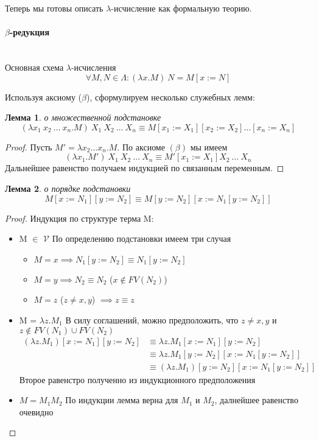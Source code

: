 \documentclass[lambda.tex]{subfiles}
\begin{document}

Теперь мы готовы описать $\lambda$-исчисление как формальную теорию.

\newpage
\paragraph{$\beta$-редукция} %
\label{par:beta reduction}~\\

Основная схема $\lambda$-исчисления
\begin{equation*}
	\forall M, N \in \Lambda : (\lambda x.M)\ N = M[x := N]\tag{$\beta$}
\end{equation*}

Используя аксиому ($\beta$), сформулируем несколько служебных лемм:
\newtheorem{lemma}{Лемма}
\begin{lemma}{о множественной подстановке}
	\[(\lambda x_1 \ x_2 \ \dots\ x_n .M)\ X_1 \ X_2 \ \dots\ X_n \equiv M[x_1 := X_1 ][x_2 := X_2]\dots[x_n := X_n ]\]
\end{lemma}
\begin{proof}
	Пусть $M' = \lambda x_2 \dots x_n .M$. По аксиоме $(\beta)$ мы имеем
	\[(\lambda x_1 .M')\ X_1 \ X_2 \ \dots\ X_n \equiv M'[x_1 := X_1 ] X_2 \ \dots\ X_n\]
	Дальнейшее равенство получаем индукцией по связанным переменным.
\end{proof}

\begin{lemma}{о порядке подстановки}
	\[M[x := N_1][y := N_2] \equiv M[y := N_2][x := N_1[y := N_2]]\]
\end{lemma}
\begin{proof}
	Индукция по структуре терма M: \\
	\begin{itemize}
		\item M $\in$ $\mathcal{V}$ По определению подстановки имеем три случая
		\begin{itemize}
		 	\item $M = x \implies N_1[y := N_2] \equiv N_1[y := N_2]$
		 	\item $M = y \implies N_2 \equiv N_2$ ($x\not\in FV(N_2)$)
		 	\item $M = z$ ($z \neq x, y$) $\implies z \equiv z$
		 \end{itemize}
		 \item M = $\lambda z.M_1$
		 В силу соглашений, можно предположить, что $z \neq x,y$ и $z\not\in FV(N_1) \cup FV(N_2)$
		 \begin{align*}
		 	(\lambda z.M_1)[x := N_1][y := N_2] &\equiv \lambda z.M_1[x := N_1][y := N_2]\\
		 										&\equiv \lambda z.M_1[y := N_2][x := N_1[y := N_2]] \\
		 										&\equiv (\lambda z.M_1)[y := N_2][x := N_1[y := N_2]]
		 \end{align*}
		 Второе равенстро полученно из индукционного предположения
		 \item $M = M_1 M_2$
		 По индукции лемма верна для $M_1$ и $M_2$, далнейшее равенство очевидно
	\end{itemize}
\end{proof}
\end{document}
